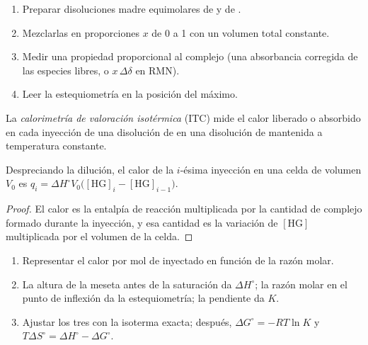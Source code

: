 \begin{method}\label{met:b3:supramolecular:job}
\begin{enumerate}
  \item Preparar disoluciones madre equimolares de  y de .
  \item Mezclarlas en proporciones $x$ de 0 a 1 con un volumen total constante.
  \item Medir una propiedad proporcional al complejo (una absorbancia corregida
        de las especies libres, o $x\,\Delta\delta$ en RMN).
  \item Leer la estequiometría en la posición del máximo.
\end{enumerate}
\end{method}

\begin{definition}\label{def:b3:supramolecular:itc}
La \emph{calorimetría de valoración isotérmica}
(ITC) mide el calor liberado o absorbido en cada inyección de una disolución de 
en una disolución de  mantenida a temperatura constante.
\end{definition}

\begin{proposition}\label{prop:b3:supramolecular:itc}
Despreciando la dilución, el calor de la $i$-ésima inyección en una celda de volumen $V_0$ es
$q_i = \Delta H^\circ V_0\bigl([\mathrm{HG}]_i - [\mathrm{HG}]_{i-1}\bigr)$.
\end{proposition}

\begin{proof}
El calor es la entalpía de reacción multiplicada por la cantidad de complejo formado durante la
inyección, y esa cantidad es la variación de $[\mathrm{HG}]$ multiplicada por el volumen de la celda.
\end{proof}

\begin{method}\label{met:b3:supramolecular:itc}
\begin{enumerate}
  \item Representar el calor por mol de  inyectado en función de la razón molar.
  \item La altura de la meseta antes de la saturación da $\Delta H^\circ$; la razón molar en
        el punto de inflexión da la estequiometría; la pendiente da $K$.
  \item Ajustar los tres con la isoterma exacta; después, $\Delta G^\circ = -RT\ln K$ y
        $T\Delta S^\circ = \Delta H^\circ - \Delta G^\circ$.
\end{enumerate}
\end{method}

